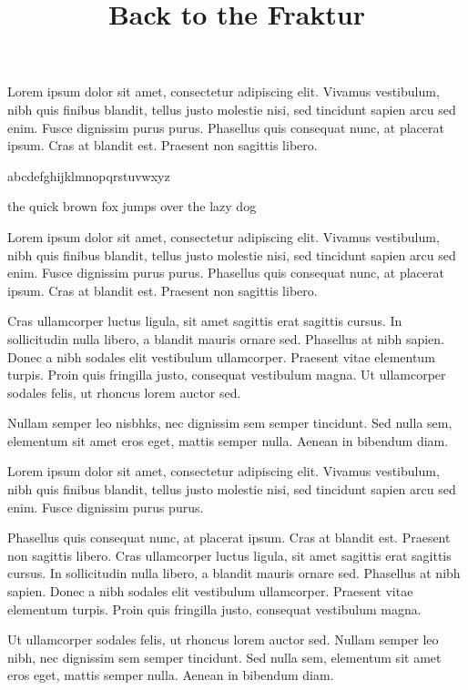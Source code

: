 

\title{Back to the Fraktur}

\Arno\currvar

Lorem ipsum dolor sit amet, consectetur adipiscing elit. Vivamus vestibulum, nibh quis finibus blandit, tellus justo molestie nisi, sed tincidunt sapien arcu sed enim. Fusce dignissim purus purus. 
Phasellus quis consequat nunc, at placerat ipsum. Cras at blandit est. Praesent non sagittis libero. 

\baselineskip
	{%
	\typosize[15/]%
	\UnifrakturMaguntia{}\currvar
	\centerline{\currvar abcdefghijklmnopqrstuvwxyz}
	\centerline{the quick brown fox jumps over the lazy dog}
	}%
\baselineskip

Lorem ipsum dolor sit amet, consectetur adipiscing elit. Vivamus vestibulum, nibh quis finibus blandit, tellus justo molestie nisi, sed tincidunt sapien arcu sed enim. Fusce dignissim purus purus. 
Phasellus quis consequat nunc, at placerat ipsum. Cras at blandit est. Praesent non sagittis libero.

Cras ullamcorper luctus ligula, sit amet sagittis erat sagittis cursus. In sollicitudin nulla libero, a blandit mauris ornare sed. Phasellus at nibh sapien. Donec a nibh sodales elit vestibulum ullamcorper. Praesent vitae elementum turpis. Proin quis fringilla justo, consequat vestibulum magna. Ut ullamcorper sodales felis, ut rhoncus lorem auctor sed.
\the\mnotesize

Nullam semper leo nisbhks, nec dignissim sem semper tincidunt. Sed nulla sem, elementum sit amet eros eget, mattis semper nulla. Aenean in bibendum diam.

Lorem ipsum dolor sit amet, consectetur adipiscing elit. Vivamus vestibulum, nibh quis finibus blandit, tellus justo molestie nisi, sed tincidunt sapien arcu sed enim. Fusce dignissim purus purus. 

Phasellus quis consequat nunc, at placerat ipsum. Cras at blandit est. Praesent non sagittis libero. Cras ullamcorper luctus ligula, sit amet sagittis erat sagittis cursus. In sollicitudin nulla libero, a blandit mauris ornare sed. Phasellus at nibh sapien. Donec a nibh sodales elit vestibulum ullamcorper. Praesent vitae elementum turpis. Proin quis fringilla justo, consequat vestibulum magna. 

Ut ullamcorper sodales felis, ut rhoncus lorem auctor sed. Nullam semper leo nibh, nec dignissim sem semper tincidunt. Sed nulla sem, elementum sit amet eros eget, mattis semper nulla. Aenean in bibendum diam.

\bye

